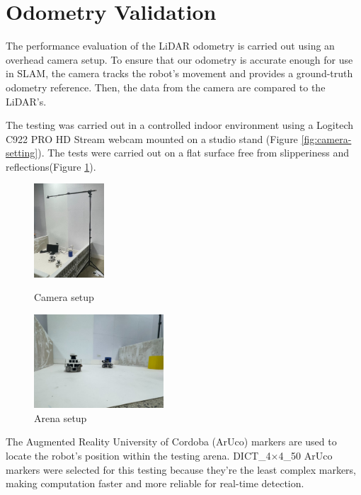 \newpage
\section*{Odometry Validation}
\quad The performance evaluation of the LiDAR odometry is carried out using an overhead camera setup. To ensure that our odometry is accurate enough for use in SLAM, the camera tracks the robot’s movement and provides a ground-truth odometry reference. Then, the data from the camera are compared to the LiDAR's.

The testing was carried out in a controlled indoor environment using a Logitech C922 PRO HD Stream webcam mounted on a studio stand (Figure \ref{fig:camera-setting}). The tests were carried out on a flat surface free from slipperiness and reflections(Figure \ref{fig:arena-setting}). 
\begin{figure}[!htb]
    \centering
    \begin{minipage}{0.48\textwidth}
        \centering
        \includegraphics[height=3.5cm]{assets/images/odometry/cam_setting.jpg}
        \caption{Camera setup}
        \label{fig:camera-setting}
    \end{minipage}\hfill
    \begin{minipage}{0.48\textwidth}
        \centering
        \includegraphics[height=3.5cm]{assets/images/odometry/arena_setting.jpg}
        \caption{Arena setup}
        \label{fig:arena-setting}
    \end{minipage}
\end{figure}

The Augmented Reality University of Cordoba (ArUco) markers are used to locate the robot's position within the testing arena. DICT\_4×4\_50 ArUco markers were selected for this testing because they're the least complex markers, making computation faster and more reliable for real-time detection. 

